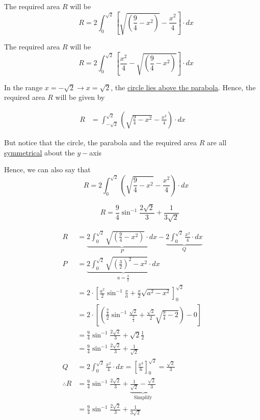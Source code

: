 \documentclass[14pt,fleqn]{extarticle}
\newcommand\ysq{\left(\frac{9}{4}-x^2 \right)}
\newcommand\intg{2\int_{0}^{\sqrt{2}}}
\begin{document}
\newcard 

The required area $R$ will be 
\[ \quad R = \intg \left[\sqrt{\ysq} - \frac{x^2}{4} \right]\cdot dx \]

\newcard 
The required area $R$ will be 
\[ \quad R = \intg \left[\frac{x^2}{4} - \sqrt{\ysq}\right]\cdot dx \]

\newcard 

In the range $x=-\sqrt{2}\rightarrow x=\sqrt{2}$, the 
\underline{circle lies above the parabola}. Hence, the
required area $R$ will be given by 

\begin{align}
R &= \int_{-\sqrt{2}}^{\sqrt{2}}\left( \sqrt{\frac{9}{4}-x^2} - \frac{x^2}{4}\right)\cdot dx
\end{align} 

But notice that the circle, the parabola and the required area $R$ are all \underline{symmetrical} about the $y-$axis\newline 

Hence, we can also say that 
\[ \quad R = \intg \left( \sqrt{\frac{9}{4}-x^2} - \frac{x^2}{4}\right)\cdot dx \]

\newcard 
\[ \qquad R = \frac{9}{4}\sin^{-1}\frac{2\sqrt{2}}{3} + \frac{1}{3\sqrt{2}} \]

\newcard 

\begin{align}
	R &= \underbrace{\intg \sqrt{\ysq}\cdot dx}_P - \underbrace{\intg \frac{x^2}{4}\cdot dx}_Q \\ 
	P &= \underbrace{\intg \sqrt{\left(\frac{3}{2} \right)^2 - x^2}\cdot dx }_{a = \frac{3}{2}} \\
	&= 2\cdot\left[ \frac{a^2}{2}\sin^{-1}\frac{x}{a}+ \frac{x}{2}\sqrt{a^2-x^2}\right]_0^{\sqrt{2}} \\
	&= 2\cdot\left[ \left(\frac{\frac{9}{4}}{2}\sin^{-1}\frac{\sqrt{2}}{\frac{3}{2}}+
\frac{\sqrt{2}}{2}\sqrt{\frac{9}{4}-2}\right)- 0\right] \\
&= \frac{9}{4}\sin^{-1}\frac{2\sqrt{2}}{3} + \sqrt{2}\frac{1}{2} \\
&=  \frac{9}{4}\sin^{-1}\frac{2\sqrt{2}}{3} + \frac{1}{\sqrt{2}} \\
Q &= 2\int_0^{\sqrt{2}}\frac{x^2}{4}\cdot dx = \left[ \frac{x^3}{6}\right]_0^{\sqrt{2}} = \frac{\sqrt{2}}{3} \\
\therefore R &= \frac{9}{4}\sin^{-1}\frac{2\sqrt{2}}{3} + 
\underbrace{\frac{1}{\sqrt{2}}- \frac{\sqrt{2}}{3}}_{\text{Simplify}} \\
&= \frac{9}{4}\sin^{-1}\frac{2\sqrt{2}}{3} + \frac{1}{3\sqrt{2}}
\end{align}
\end{document}
